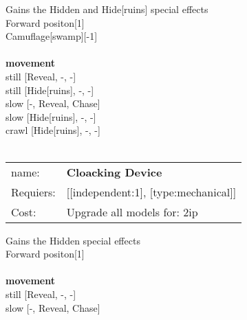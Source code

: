 Gains the Hidden and Hide[ruins] special effects\\ 
Forward positon[1]\\ 
Camuflage[swamp][-1]\\ 








\ \\ {\bf movement } \\
still [Reveal, -, -] \\
still [Hide[ruins], -, -] \\
slow [-, Reveal, Chase] \\
slow [Hide[ruins], -, -] \\
crawl [Hide[ruins], -, -] \\

\ \\
\begin{tabular}{ll}
name: & {\bf Cloacking Device } \\
Requiers: & [[independent:1], [type:mechanical]] \\
Cost: & Upgrade all models for: 2ip \\
\end{tabular}

Gains the Hidden special effects\\ 
Forward positon[1]\\ 








\ \\ {\bf movement } \\
still [Reveal, -, -] \\
slow [-, Reveal, Chase] \\

